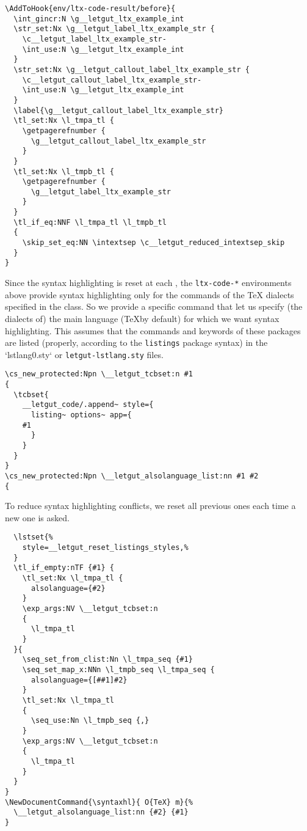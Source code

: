\documentclass{letgut}
\begin{document}
\begin{lstlisting}
\AddToHook{env/ltx-code-result/before}{
  \int_gincr:N \g__letgut_ltx_example_int
  \str_set:Nx \g__letgut_label_ltx_example_str {
    \c__letgut_label_ltx_example_str-
    \int_use:N \g__letgut_ltx_example_int
  }
  \str_set:Nx \g__letgut_callout_label_ltx_example_str {
    \c__letgut_callout_label_ltx_example_str-
    \int_use:N \g__letgut_ltx_example_int
  }
  \label{\g__letgut_callout_label_ltx_example_str}
  \tl_set:Nx \l_tmpa_tl {
    \getpagerefnumber {
      \g__letgut_callout_label_ltx_example_str
    }
  }
  \tl_set:Nx \l_tmpb_tl {
    \getpagerefnumber {
      \g__letgut_label_ltx_example_str
    }
  }
  \tl_if_eq:NNF \l_tmpa_tl \l_tmpb_tl
  {
    \skip_set_eq:NN \intextsep \c__letgut_reduced_intextsep_skip
  }
}
\end{lstlisting}

Since the syntax highlighting is reset at each \lstinline++, the \lstinline+ltx-code-*+
environments above provide syntax highlighting only for the commands of the \TeX
dialects specified in the class. So we provide a specific command that let us
specify (the dialects of) the main language (\TeX by default) for which we want
syntax highlighting. This assumes that the commands and keywords of these
packages are listed (properly, according to the \lstinline+listings+ package syntax) in
the `lstlang0.sty` or \lstinline+letgut-lstlang.sty+ files.

\begin{lstlisting}
\cs_new_protected:Npn \__letgut_tcbset:n #1
{
  \tcbset{
    __letgut_code/.append~ style={
      listing~ options~ app={
	#1
      }
    }
  }
}
\cs_new_protected:Npn \__letgut_alsolanguage_list:nn #1 #2
{
\end{lstlisting}
To reduce syntax highlighting conflicts, we reset all previous ones each
time a new one is asked.
\begin{lstlisting}
  \lstset{%
    style=__letgut_reset_listings_styles,%
  }
  \tl_if_empty:nTF {#1} {
    \tl_set:Nx \l_tmpa_tl {
      alsolanguage={#2}
    }
    \exp_args:NV \__letgut_tcbset:n
    {
      \l_tmpa_tl
    }
  }{
    \seq_set_from_clist:Nn \l_tmpa_seq {#1}
    \seq_set_map_x:NNn \l_tmpb_seq \l_tmpa_seq {
      alsolanguage={[##1]#2}
    }
    \tl_set:Nx \l_tmpa_tl
    {
      \seq_use:Nn \l_tmpb_seq {,}
    }
    \exp_args:NV \__letgut_tcbset:n
    {
      \l_tmpa_tl
    }
  }
}
\NewDocumentCommand{\syntaxhl}{ O{TeX} m}{%
  \__letgut_alsolanguage_list:nn {#2} {#1}
}
\end{lstlisting}
\end{document}
